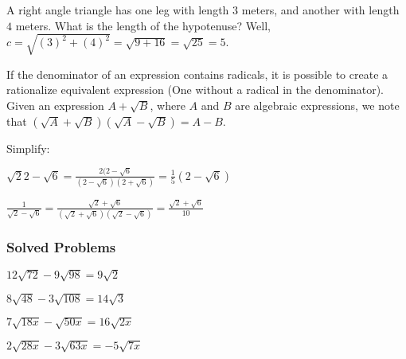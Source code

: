 \documentclass[crop=false,class=book,oneside]{standalone}                      %
\begin{document}
        \begin{example}
        A right angle triangle has one leg with length $3$ meters, and another with length $4$ meters. What is the length of the hypotenuse? Well, $c = \sqrt{(3)^2+(4)^2} = \sqrt{9+16} = \sqrt{25} = 5$.
        \end{example}
        \begin{remark}
        If the denominator of an expression contains radicals, it is possible to create a rationalize equivalent expression (One without a radical in the denominator). Given an expression $A+\sqrt{B}$, where $A$ and $B$ are algebraic expressions, we note that $(\sqrt{A}+\sqrt{B})(\sqrt{A}-\sqrt{B}) = A-B$. 
        \end{remark}
        \begin{example}
        Simplify:
        \begin{enumerate}
        \begin{multicols}{2}
        \item $\sqrt{2}{2-\sqrt{6}} = \frac{2(2-\sqrt{6}}{(2-\sqrt{6})(2+\sqrt{6})} = \frac{1}{5}(2-\sqrt{6})$
        \item $\frac{1}{\sqrt{2}-\sqrt{6}} = \frac{\sqrt{2}+\sqrt{6}}{(\sqrt{2}+\sqrt{6})(\sqrt{2}-\sqrt{6})} = \frac{\sqrt{2}+\sqrt{6}}{10}$
        \end{multicols}
        \end{enumerate}
        \end{example}
        \subsubsection{Solved Problems}
        \begin{enumerate}
        \begin{multicols}{4}
        \item $12\sqrt{72} - 9\sqrt{98} = 9\sqrt{2}$
        \item $8\sqrt{48} - 3\sqrt{108} = 14\sqrt{3}$
        \item $7\sqrt{18x} - \sqrt{50x} = 16\sqrt{2x}$
        \item $2\sqrt{28x} - 3\sqrt{63x} = -5\sqrt{7x}$
        \end{multicols}
        \end{enumerate}
\end{document}
